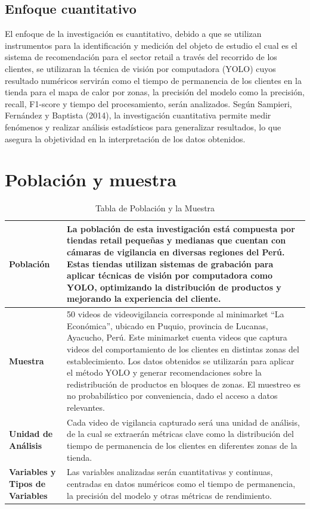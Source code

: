 \subsection{Enfoque cuantitativo}
El enfoque de la investigación es cuantitativo, debido a que se utilizan instrumentos para la identificación y medición del objeto de estudio el cual es el sistema de recomendación para el sector retail a través del recorrido de los clientes, se utilizaran la técnica de visión por computadora (YOLO) cuyos resultado numéricos servirán como el tiempo de permanencia de los clientes en la tienda para el mapa de calor por zonas, la precisión del modelo como la precisión, recall, F1-score y tiempo del procesamiento, serán analizados. Según Sampieri, Fernández y Baptista (2014), la investigación cuantitativa permite medir fenómenos y realizar análisis estadísticos para generalizar resultados, lo que asegura la objetividad en la interpretación de los datos obtenidos.

\section{Población y muestra}

\begin{table}[H]
\centering

\begin{tabular}{|>{\raggedright}p{3.5cm}|p{10cm}|}
\hline
\textbf{Población} & La población de esta investigación está compuesta por tiendas retail pequeñas y medianas que cuentan con cámaras de vigilancia en diversas regiones del Perú. Estas tiendas utilizan sistemas de grabación para aplicar técnicas de visión por computadora como YOLO, optimizando la distribución de productos y mejorando la experiencia del cliente. \\ \hline
\textbf{Muestra}   & 50 videos de videovigilancia corresponde al minimarket “La Económica”, ubicado en Puquio, provincia de Lucanas, Ayacucho, Perú. Este minimarket cuenta videos que captura videos del comportamiento de los clientes en distintas zonas del establecimiento. Los datos obtenidos se utilizarán para aplicar el método YOLO y generar recomendaciones sobre la redistribución de productos en bloques de zonas. El muestreo es no probabilístico por conveniencia, dado el acceso a datos relevantes. \\ \hline
\textbf{Unidad de Análisis}  & Cada video de vigilancia capturado será una unidad de análisis, de la cual se extraerán métricas clave como la distribución del tiempo de permanencia de los clientes en diferentes zonas de la tienda. \\ \hline
\textbf{Variables y Tipos de Variables}  & Las variables analizadas serán cuantitativas y continuas, centradas en datos numéricos como el tiempo de permanencia, la precisión del modelo y otras métricas de rendimiento. \\ \hline
\end{tabular}
\caption{Tabla de Población y la Muestra}
\label{tab:poblacion_muestra}
\end{table}


